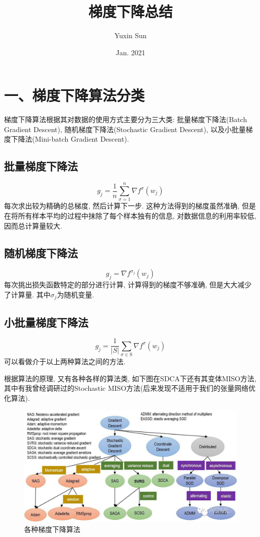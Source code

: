 \documentclass{article}
\title{梯度下降总结}
\author{Yuxin Sun}
\date{Jan. 2021}
\begin{document}
\maketitle

\section*{一、梯度下降算法分类}

梯度下降算法根据其对数据的使用方式主要分为三大类: 批量梯度下降法(Batch Gradient Descent), 随机梯度下降法(Stochastic Gradient Descent), 以及小批量梯度下降法(Mini-batch Gradient Descent).
\subsection*{批量梯度下降法}
\begin{equation}
    g_j = \frac{1}{n}\sum_{\sigma=1}^n \nabla f^\sigma(w_j)
\end{equation}
每次求出较为精确的总梯度, 然后计算下一步. 这种方法得到的梯度虽然准确, 但是在将所有样本平均的过程中抹除了每个样本独有的信息, 对数据信息的利用率较低, 因而总计算量较大.

\subsection*{随机梯度下降法}
\begin{equation}
    g_j = \nabla f^{\sigma_j}(w_j)
\end{equation}
每次挑出损失函数特定的部分进行计算, 计算得到的梯度不够准确, 但是大大减少了计算量. 其中$\sigma_j$为随机变量.

\subsection*{小批量梯度下降法}
\begin{equation}
    g_j = \frac{1}{\lvert S\rvert}\sum_{\sigma\in\mathrm{S}} \nabla f^\sigma(w_j)
\end{equation}
可以看做介于以上两种算法之间的方法.

根据算法的原理, 又有各种各样的算法类, 如下图在SDCA下还有其变体MISO方法, 其中有我曾经调研过的Stochastic MISO方法(后来发现不适用于我们的张量网络优化算法).
\begin{figure}[h!]
\includegraphics[width=\textwidth]{image/algoFamily.jpeg}
\caption{各种梯度下降算法}
\end{figure}
\end{document}
